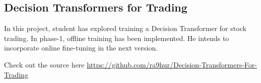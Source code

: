 \documentclass[11pt,a4paper]{article}
\begin{document}
\subsection{Decision Transformers for Trading}\label{decision-transformers-for-trading}

In this project, student has explored training a Decision Transformer for stock trading. In phase-1, offline training has been implemented. He intends to incorporate online fine-tuning in the next version.


Check out the source here \url{https://github.com/ra9hur/Decision-Transformers-For-Trading}
\end{document}
